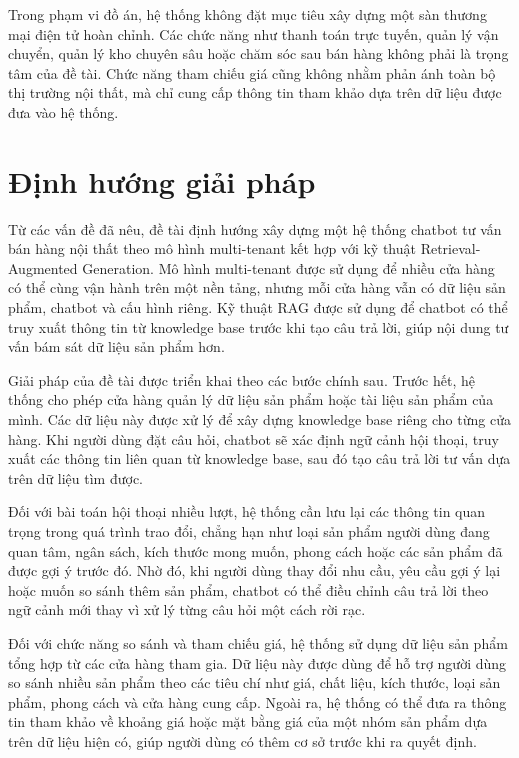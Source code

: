 \documentclass[../DoAn.tex]{subfiles}
\begin{document}
Trong phạm vi đồ án, hệ thống không đặt mục tiêu xây dựng một sàn thương mại điện tử hoàn chỉnh. Các chức năng như thanh toán trực tuyến, quản lý vận chuyển, quản lý kho chuyên sâu hoặc chăm sóc sau bán hàng không phải là trọng tâm của đề tài. Chức năng tham chiếu giá cũng không nhằm phản ánh toàn bộ thị trường nội thất, mà chỉ cung cấp thông tin tham khảo dựa trên dữ liệu được đưa vào hệ thống.

\section{Định hướng giải pháp}
\label{section:1.3}

Từ các vấn đề đã nêu, đề tài định hướng xây dựng một hệ thống chatbot tư vấn bán hàng nội thất theo mô hình multi-tenant kết hợp với kỹ thuật Retrieval-Augmented Generation. Mô hình multi-tenant được sử dụng để nhiều cửa hàng có thể cùng vận hành trên một nền tảng, nhưng mỗi cửa hàng vẫn có dữ liệu sản phẩm, chatbot và cấu hình riêng. Kỹ thuật RAG được sử dụng để chatbot có thể truy xuất thông tin từ knowledge base trước khi tạo câu trả lời, giúp nội dung tư vấn bám sát dữ liệu sản phẩm hơn.

Giải pháp của đề tài được triển khai theo các bước chính sau. Trước hết, hệ thống cho phép cửa hàng quản lý dữ liệu sản phẩm hoặc tài liệu sản phẩm của mình. Các dữ liệu này được xử lý để xây dựng knowledge base riêng cho từng cửa hàng. Khi người dùng đặt câu hỏi, chatbot sẽ xác định ngữ cảnh hội thoại, truy xuất các thông tin liên quan từ knowledge base, sau đó tạo câu trả lời tư vấn dựa trên dữ liệu tìm được.

Đối với bài toán hội thoại nhiều lượt, hệ thống cần lưu lại các thông tin quan trọng trong quá trình trao đổi, chẳng hạn như loại sản phẩm người dùng đang quan tâm, ngân sách, kích thước mong muốn, phong cách hoặc các sản phẩm đã được gợi ý trước đó. Nhờ đó, khi người dùng thay đổi nhu cầu, yêu cầu gợi ý lại hoặc muốn so sánh thêm sản phẩm, chatbot có thể điều chỉnh câu trả lời theo ngữ cảnh mới thay vì xử lý từng câu hỏi một cách rời rạc.

Đối với chức năng so sánh và tham chiếu giá, hệ thống sử dụng dữ liệu sản phẩm tổng hợp từ các cửa hàng tham gia. Dữ liệu này được dùng để hỗ trợ người dùng so sánh nhiều sản phẩm theo các tiêu chí như giá, chất liệu, kích thước, loại sản phẩm, phong cách và cửa hàng cung cấp. Ngoài ra, hệ thống có thể đưa ra thông tin tham khảo về khoảng giá hoặc mặt bằng giá của một nhóm sản phẩm dựa trên dữ liệu hiện có, giúp người dùng có thêm cơ sở trước khi ra quyết định.
\end{document}
